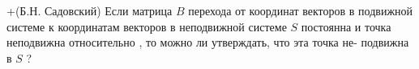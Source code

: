 +(Б.Н. Садовский)
Если матрица $B$ перехода от координат векторов в подвижной системе 
к координатам векторов в неподвижной системе $S$ постоянна и точка 
неподвижна относительно  , то можно ли утверждать, что эта точка не-
подвижна в $S$ ?
